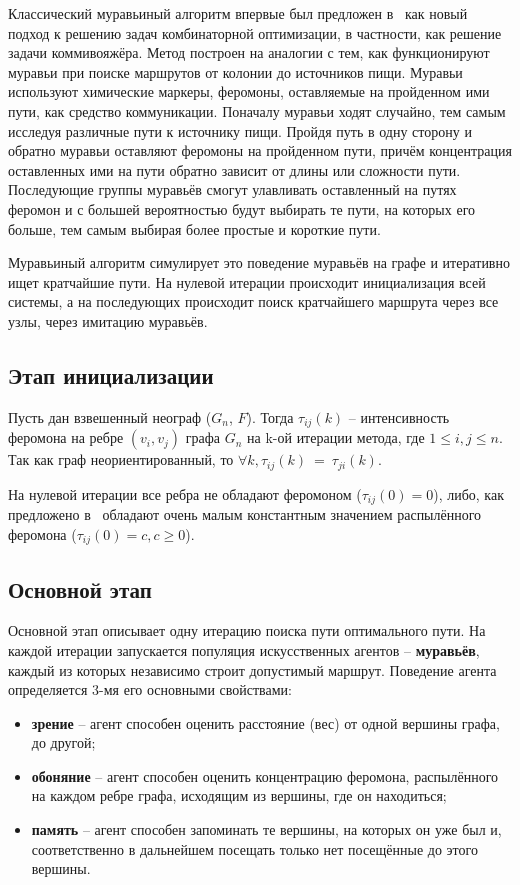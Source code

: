 Классический муравьиный алгоритм впервые был предложен в~\cite{ant-origin} как новый подход к решению задач комбинаторной оптимизации, в частности, как решение задачи коммивояжёра. Метод построен на аналогии с тем, как функционируют муравьи при поиске маршрутов от колонии до источников пищи. Муравьи используют химические маркеры, феромоны, оставляемые на пройденном ими пути, как средство коммуникации. Поначалу муравьи ходят случайно, тем самым исследуя различные пути к источнику пищи. Пройдя путь в одну сторону и обратно муравьи оставляют феромоны на пройденном пути, причём концентрация оставленных ими на пути обратно зависит от длины или сложности пути. Последующие группы муравьёв смогут улавливать оставленный на путях феромон и с большей вероятностью будут выбирать те пути, на которых его больше, тем самым выбирая более простые и короткие пути.

Муравьиный алгоритм симулирует это поведение муравьёв на графе и итеративно ищет кратчайшие пути. На нулевой итерации происходит инициализация всей системы, а на последующих происходит поиск кратчайшего маршрута через все узлы, через имитацию муравьёв.

\subsection{Этап инициализации}

Пусть дан взвешенный неограф ($G_n$, $F$). Тогда $\tau_{ij}(k)$ -- интенсивность феромона на ребре $(v_i, v_j)$ графа $G_n$ на k-ой итерации метода, где $1\leqslant i,j \leqslant n$. Так как граф неориентированный, то $\forall k, \tau_{ij}(k)~=~\tau_{ji}(k)$.

На нулевой итерации все ребра не обладают феромоном ($\tau_{ij}(0) = 0$), либо, как предложено в~\cite{ant-origin} обладают очень малым константным значением распылённого феромона ($\tau_{ij}(0) = c, c\geqslant0$).

\subsection{Основной этап}

Основной этап описывает одну итерацию поиска пути оптимального пути. На каждой итерации запускается популяция искусственных агентов -- \textbf{муравьёв}, каждый из которых независимо строит допустимый маршрут. Поведение агента определяется 3-мя его основными свойствами:

\begin{itemize}
	\item \textbf{зрение} -- агент способен оценить расстояние (вес) от одной вершины графа, до
	другой;
	\item \textbf{обоняние} -- агент способен оценить концентрацию феромона, распылённого на каждом ребре графа, исходящим из вершины, где он находиться;
	\item \textbf{память} -- агент способен запоминать те вершины, на которых он уже был и, соответственно в дальнейшем посещать только нет посещённые до этого вершины.
\end{itemize}

